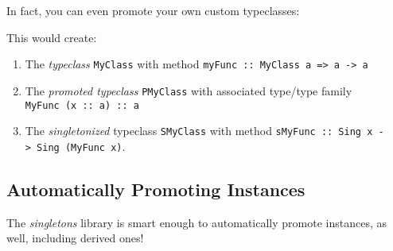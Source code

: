 \documentclass[]{article}
\newenvironment{Shaded}{}{}
\newcommand{\FunctionTok}[1]{\textcolor[rgb]{0.02,0.16,0.49}{#1}}
\newcommand{\NormalTok}[1]{#1}
\begin{document}
In fact, you can even promote your own custom typeclasses:

\begin{Shaded}
\end{Shaded}

This would create:

\begin{enumerate}
\def\labelenumi{\arabic{enumi}.}
\tightlist
\item
  The \emph{typeclass} \texttt{MyClass} with method
  \texttt{myFunc\ ::\ MyClass\ a\ =\textgreater{}\ a\ -\textgreater{}\ a}
\item
  The \emph{promoted typeclass} \texttt{PMyClass} with associated type/type
  family \texttt{MyFunc\ (x\ ::\ a)\ ::\ a}
\item
  The \emph{singletonized} typeclass \texttt{SMyClass} with method
  \texttt{sMyFunc\ ::\ Sing\ x\ -\textgreater{}\ Sing\ (MyFunc\ x)}.
\end{enumerate}

\hypertarget{automatically-promoting-instances}{%
\subsection{Automatically Promoting
Instances}\label{automatically-promoting-instances}}

The \emph{singletons} library is smart enough to automatically promote
instances, as well, including derived ones!

\begin{Shaded}
\end{Shaded}
\end{document}
